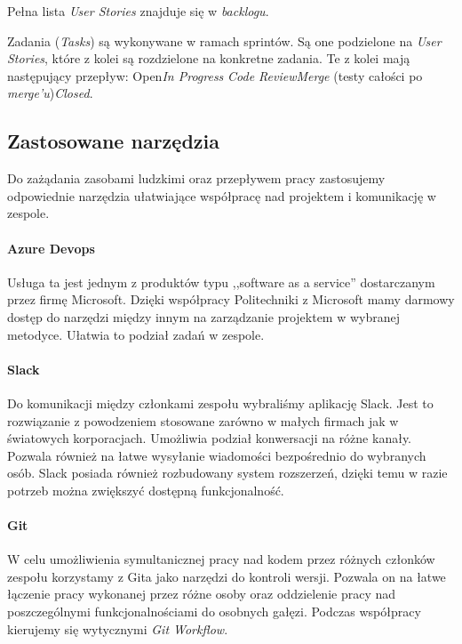 \documentclass[10pt, titlepage, oneside, a4paper]{article}
\begin{document}
	Pełna lista \textit{User Stories} znajduje się w \textit{backlogu}.

	Zadania (\textit{Tasks}) są wykonywane w ramach sprintów. Są one podzielone na \textit{User Stories}, które z kolei są rozdzielone na konkretne zadania. Te z kolei mają następujący przepływ: Open\textrightarrow \textit{In Progress} \textrightarrow \textit{Code Review}\textrightarrow \textit{Merge} (testy całości po \textit{merge'u})\textrightarrow \textit{Closed}.
	
	\subsection{Zastosowane narzędzia}
	Do zażądania zasobami ludzkimi oraz przepływem pracy zastosujemy odpowiednie narzędzia ułatwiające współpracę nad projektem i komunikację w zespole.

	\paragraph{Azure Devops} \mbox{} \par
	Usługa ta jest jednym z produktów typu ,,software as a service'' dostarczanym przez firmę Microsoft.
	Dzięki współpracy Politechniki z Microsoft mamy darmowy dostęp do narzędzi między innym na zarządzanie projektem w wybranej metodyce. Ułatwia to podział zadań w zespole.

	\paragraph{Slack} \mbox{} \par
	Do komunikacji między członkami zespołu wybraliśmy aplikację Slack. Jest to rozwiązanie z powodzeniem stosowane zarówno w małych firmach jak w światowych korporacjach.
	Umożliwia podział konwersacji na różne kanały. Pozwala również na łatwe wysyłanie wiadomości bezpośrednio do wybranych osób.
	Slack posiada również rozbudowany system rozszerzeń, dzięki temu w razie potrzeb można zwiększyć dostępną funkcjonalność.

	\paragraph{Git} \mbox{} \par
	W celu umożliwienia symultanicznej pracy nad kodem przez różnych członków zespołu korzystamy z Gita jako narzędzi do kontroli wersji.
	Pozwala on na łatwe łączenie pracy wykonanej przez różne osoby oraz oddzielenie pracy nad poszczególnymi funkcjonalnościami do osobnych gałęzi.
	Podczas współpracy kierujemy się wytycznymi \textit{Git Workflow}.
 
\end{document}

